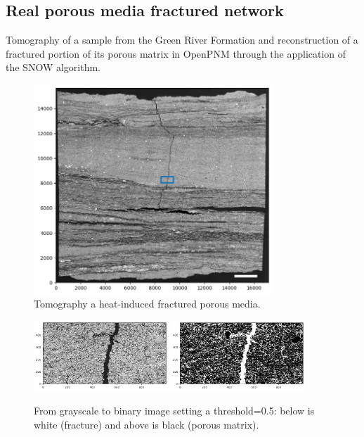 \documentclass{article}
\begin{document}
\subsection{Real porous media fractured network}
Tomography of a sample from the Green River Formation and reconstruction of a fractured portion of its porous matrix in OpenPNM through the application of the SNOW algorithm.
\begin{figure}[htbp]
    \centering
    \includegraphics[width=0.8\textwidth]{images/digitalRocks/GreenRiverFormation.png}
    \caption{Tomography a heat-induced fractured porous media.}
    \label{fig:GreenRiver}
\end{figure}
\begin{figure}[htbp!]
    \centering
    \includegraphics[width=0.45\textwidth]{images/digitalRocks/fractureDetail.png}
    \hspace{0.05\textwidth}
    \includegraphics[width=0.45\textwidth]{images/digitalRocks/fractureBinary.png}
    \caption{From grayscale to binary image setting a threshold=0.5: below is white (fracture) and above is black (porous matrix).}
    \label{fig:FractureBin}
\end{figure}
\end{document}
